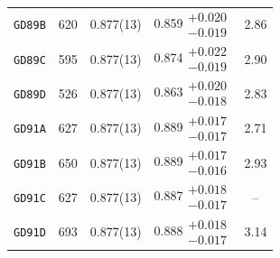 \begin{table}
{\begin{tabular}{lcccc}
		\texttt{GD89B}	&	620 	&	0.877(13)	&	0.859$\substack{+0.020\\-0.019}$	&	2.86	\\
		\texttt{GD89C}	&	595 	&	0.877(13)	&	0.874$\substack{+0.022\\-0.019}$	&	2.90	\\
		\texttt{GD89D}	&	526 	&	0.877(13)	&	0.863$\substack{+0.020\\-0.018}$	&	2.83	\\
		\texttt{GD91A}	&	627 	&	0.877(13)	&	0.889$\substack{+0.017\\-0.017}$	&	2.71	\\
		\texttt{GD91B}	&	650 	&	0.877(13)	&	0.889$\substack{+0.017\\-0.016}$	&	2.93	\\
		\texttt{GD91C}	&	627 	&	0.877(13)	&	0.887$\substack{+0.018\\-0.017}$	&	--	\\
		\texttt{GD91D}	&	693 	&	0.877(13)	&	0.888$\substack{+0.018\\-0.017}$	&	3.14	\\
		\bottomrule
	\end{tabular}
}
\end{table}

